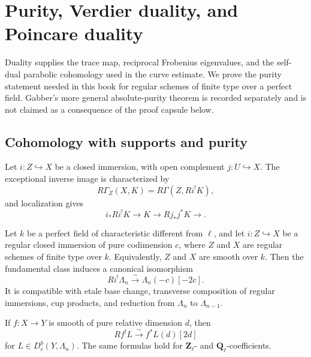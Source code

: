 \chapter{Purity, Verdier duality, and Poincare duality}
\label{ch:duality}

Duality supplies the trace map, reciprocal Frobenius eigenvalues, and the
self-dual parabolic cohomology used in the curve estimate.  We prove the
purity statement needed in this book for regular schemes of finite type over
a perfect field.  Gabber's more general absolute-purity theorem is recorded
separately and is not claimed as a consequence of the proof capsule below.

\section{Cohomology with supports and purity}

Let \(i:Z\hookrightarrow X\) be a closed immersion, with open complement
\(j:U\hookrightarrow X\).  The exceptional inverse image is characterized by
\[
 R\Gamma_Z(X,K)=R\Gamma(Z,Ri^!K),
\]
and localization gives
\[
 i_*Ri^!K\longrightarrow K\longrightarrow Rj_*j^*K\longrightarrow.
\tag{7.1}\label{eq:costalk-localization}
\]

\begin{theorem}
\label{thm:absolute-purity}
Let \(k\) be a perfect field of characteristic different from \(\ell\), and
let \(i:Z\hookrightarrow X\) be a regular closed immersion of pure
codimension \(c\), where \(Z\) and \(X\) are regular schemes of finite type
over \(k\).  Equivalently, \(Z\) and \(X\) are smooth over \(k\).  Then the
fundamental class induces a canonical isomorphism
\[
 Ri^!\Lambda_n\xrightarrow{\sim}\Lambda_n(-c)[-2c].
\tag{7.2}\label{eq:absolute-purity}
\]
It is compatible with etale base change, transverse composition of regular
immersions, cup products, and reduction from \(\Lambda_n\) to
\(\Lambda_{n-1}\).

If \(f:X\to Y\) is smooth of pure relative dimension \(d\), then
\[
 Rf^!L\xrightarrow{\sim}f^*L(d)[2d]
\tag{7.3}\label{eq:smooth-purity}
\]
for \(L\in D^b_c(Y,\Lambda_n)\).  The same formulas hold for
\(\mathbf Z_\ell\)- and \(\mathbf Q_\ell\)-coefficients.
\end{theorem}

